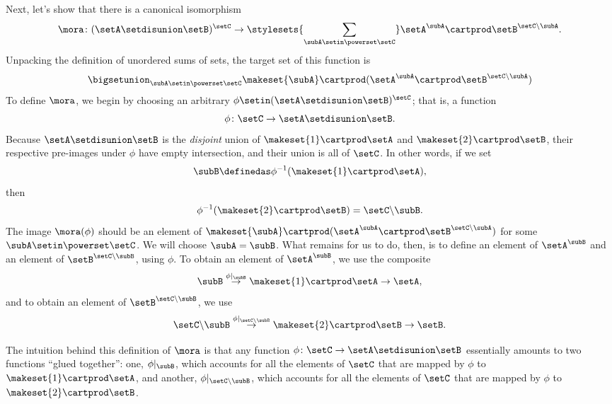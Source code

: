 Next, let's show that there is a canonical isomorphism
\begin{equation}
\mora \colon (\setA \setdisunion \setB)^{\setC}  \to \stylesets{\sum_{\subA \setin \powerset \setC}} \setA^\subA \cartprod \setB^{\setC \backslash \subA}.
\end{equation}
Unpacking the definition of unordered sums of sets, the target set of this function is
\begin{equation}
\bigsetunion_{\subA \setin  \powerset \setC} \makeset{\subA} \cartprod (\setA^{\subA} \cartprod \setB^{\setC \backslash \subA} ) 
\end{equation}
To define $\mora$, we begin by choosing an arbitrary $\phi \setin (\setA \setdisunion \setB)^{\setC}$; that is, a function 
\begin{equation}
\phi \colon \setC \to \setA \setdisunion \setB.
\end{equation}
Because $\setA \setdisunion \setB$ is the \emph{disjoint} union of $\makeset{1} \cartprod \setA$ and $\makeset{2} \cartprod \setB$, their respective pre-images under $\phi$ have empty intersection, and their union is all of $\setC$. In other words, if we set 
\begin{equation}
\subB \definedas \phi^{-1}(\makeset{1} \cartprod \setA),
\end{equation}
then
\begin{equation}
\phi^{-1}(\makeset{2} \cartprod \setB)  = \setC \backslash \subB. 
\end{equation}
The image $\mora(\phi)$ should be an element of $\makeset{\subA} \cartprod (\setA^{\subA} \cartprod \setB^{\setC \backslash \subA} )$ for some $\subA \setin \powerset \setC$. We will choose $\subA = \subB$. What remains for us to do, then, is to define an element of $\setA^{\subB}$ and an element of $\setB^{\setC \backslash \subB}$, using $\phi$. To obtain an element of $\setA^{\subB}$, we use the composite
\begin{equation}
\subB \overset{\phi \vert_\subB}{\to} \makeset{1} \cartprod \setA \to \setA, 
\end{equation}
and to obtain an element of $\setB^{\setC \backslash \subB}$, we use
\begin{equation}
\setC \backslash \subB \overset{\phi \vert_{\setC \backslash \subB}}{\to} \makeset{2} \cartprod \setB \to \setB. 
\end{equation}

The intuition behind this definition of $\mora$ is that any function $\phi \colon \setC \to \setA \setdisunion \setB
$ essentially amounts to two functions ``glued together'': one, $\phi \vert_\subB$, which accounts for all the elements of $\setC$ that are mapped by $\phi$ to $\makeset{1} \cartprod \setA$, and another, $\phi \vert_{\setC \backslash \subB}$, which accounts for all the elements of $\setC$ that are mapped by $\phi$ to $\makeset{2} \cartprod \setB$. 

